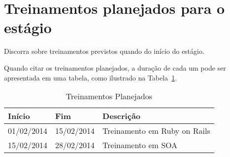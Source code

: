 \section{Treinamentos planejados para o estágio}

Discorra sobre treinamentos previstos quando do início do estágio.

Quando citar os treinamentos planejados, a duração de cada um pode ser apresentada em uma tabela, como ilustrado na Tabela~\ref{tab:tab2}.

\begin{table}[!ht]
\begin{center}
\caption[Treinamentos Planejados]
{Treinamentos Planejados}\label{tab:tab2}

\begin{tabular}{llp{7cm}}
\hline

\hline
\textbf{Início}    & \textbf{Fim} &  \textbf{Descrição}                             \\
\hline
01/02/2014       & 15/02/2014                & Treinamento em Ruby on Rails \\
15/02/2014       & 28/02/2014                & Treinamento em SOA\\

\hline
\end{tabular}
\end{center}
\end{table}
